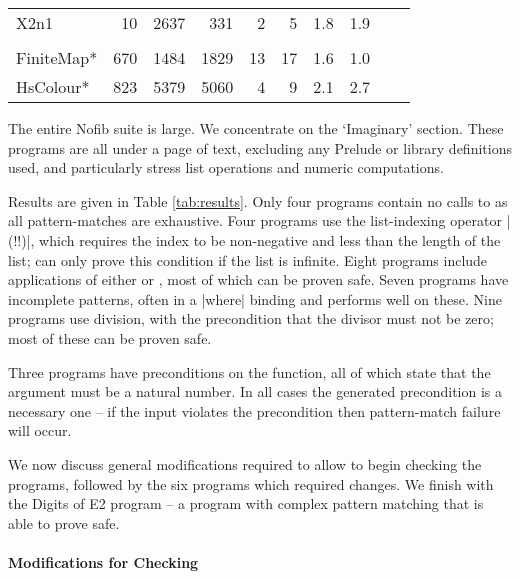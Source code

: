\begin{table}
\begin{tabular*}{\linewidth}{lrrrrrrlll}
\hspace{-2mm} X2n1                         & 10 & 2637 &  331 & 2 &  5 & 1.8 & 1.9 \\
\vspace{-1ex} \\
\hspace{-2mm} FiniteMap*    \hspace{-3mm} & 670 & 1484 & 1829 & 13 & 17 & 1.6 & 1.0 \\
\hspace{-2mm} HsColour*     \hspace{-3mm} & 823 & 5379 & 5060 & 4 &  9 & 2.1 & 2.7 \\
\hline
\end{tabular*}
\figureend
\end{table}

The entire Nofib suite \citep{nofib} is large. We concentrate on the `Imaginary' section. These programs are all under a page of text, excluding any Prelude or library definitions used, and particularly stress list operations and numeric computations.

Results are given in Table \ref{tab:results}. Only four programs contain no calls to  as all pattern-matches are exhaustive. Four programs use the list-indexing operator |(!!)|, which requires the index to be non-negative and less than the length of the list; \catch{} can only prove this condition if the list is infinite. Eight programs include applications of either  or , most of which can be proven safe. Seven programs have incomplete patterns, often in a |where| binding and \catch{} performs well on these. Nine programs use division, with the precondition that the divisor must not be zero; most of these can be proven safe.

Three programs have preconditions on the  function, all of which state that the argument must be a natural number. In all cases the generated precondition is a necessary one -- if the input violates the precondition then pattern-match failure will occur.

We now discuss general modifications required to allow \catch{} to begin checking the programs, followed by the six programs which required changes. We finish with the Digits of E2 program -- a program with complex pattern matching that \catch{} is able to prove safe.

\paragraph{Modifications for Checking}

